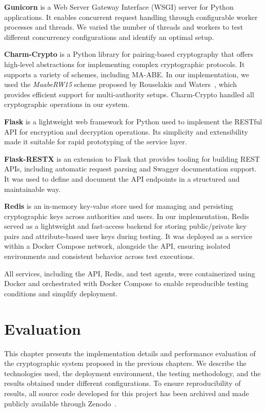\documentclass[cic,tc,english]{iiufrgs}
\numberwithin{algorithm}{chapter}
\begin{document}
            \textbf{Gunicorn} is a Web Server Gateway Interface (WSGI) server for Python applications. It enables concurrent request handling through configurable worker processes and threads. We varied the number of threads and workers to test different concurrency configurations and identify an optimal setup.

            \textbf{Charm-Crypto} is a Python library for pairing-based cryptography that offers high-level abstractions for implementing complex cryptographic protocols. It supports a variety of schemes, including MA-ABE. In our implementation, we used the \emph{MaabeRW15} scheme proposed by Rouselakis and Waters~\citep{rouselakis2015efficient}, which provides efficient support for multi-authority setups. Charm-Crypto handled all cryptographic operations in our system.

            \textbf{Flask} is a lightweight web framework for Python used to implement the RESTful API for encryption and decryption operations. Its simplicity and extensibility made it suitable for rapid prototyping of the service layer.

            \textbf{Flask-RESTX} is an extension to Flask that provides tooling for building REST APIs, including automatic request parsing and Swagger documentation support. It was used to define and document the API endpoints in a structured and maintainable way.

            \textbf{Redis} is an in-memory key-value store used for managing and persisting cryptographic keys across authorities and users. In our implementation, Redis served as a lightweight and fast-access backend for storing public/private key pairs and attribute-based user keys during testing. It was deployed as a service within a Docker Compose network, alongside the API, ensuring isolated environments and consistent behavior across test executions.

            All services, including the API, Redis, and test agents, were containerized using Docker and orchestrated with Docker Compose to enable reproducible testing conditions and simplify deployment.

\chapter{Evaluation}
    \label{chap:evaluation}
    This chapter presents the implementation details and performance evaluation of the cryptographic system proposed in the previous chapters. We describe the technologies used, the deployment environment, the testing methodology, and the results obtained under different configurations. To ensure reproducibility of results, all source code developed for this project has been archived and made publicly available through Zenodo~\citep{maabeflask}.
\end{document}
